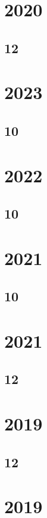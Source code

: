 \documentclass[11pt]{book}
\begin{document}
\section{2020}
\subsection{12}

\section{2023}
\subsection{10}

\section{2022}
\subsection{10}

\section{2021}
\subsection{10}



\section{2021}
\subsection{12}


\section{2019}
\subsection{12}



\section{2019} 
\end{document}
